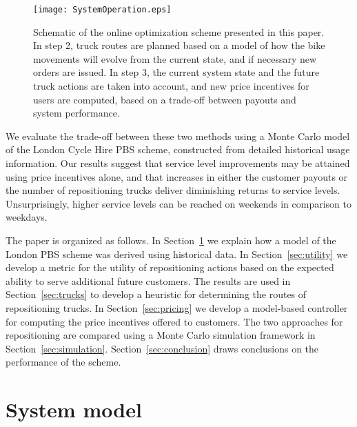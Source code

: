 \documentclass{article}
\begin{document}
\begin{figure}
  \centering
  \texttt{[image: SystemOperation.eps]}
  \caption{Schematic of the online optimization scheme presented in this paper.
    In step 2, truck routes are planned based on a model of how the bike
    movements will evolve from the current state, and if necessary new orders
    are issued. In step 3, the current system state and the future truck actions
    are taken into account, and new price incentives for users are computed,
    based on a trade-off between payouts and system performance.}
  \label{fig:sysop}
\end{figure}

We evaluate the trade-off between these two methods using a Monte Carlo model of
the London Cycle Hire PBS scheme, constructed from detailed historical usage
information. Our results suggest that service level improvements may be attained
using price incentives alone, and that increases in either the customer payouts
or the number of repositioning trucks deliver diminishing returns to service
levels. Unsurprisingly, higher service levels can be reached on weekends in
comparison to weekdays.

The paper is organized as follows. In Section~\ref{sec:model} we explain how a
model of the London PBS scheme was derived using historical data. In
Section~\ref{sec:utility} we develop a metric for the utility of repositioning
actions based on the expected ability to serve additional future customers. The
results are used in Section~\ref{sec:trucks} to develop a heuristic for
determining the routes of repositioning trucks. In Section~\ref{sec:pricing} we
develop a model-based controller for computing the price incentives offered to
customers. The two approaches for repositioning are compared using a Monte Carlo
simulation framework in Section~\ref{sec:simulation}.
Section~\ref{sec:conclusion} draws conclusions on the performance of the scheme.

\section{System model}
\label{sec:model}
\end{document}
